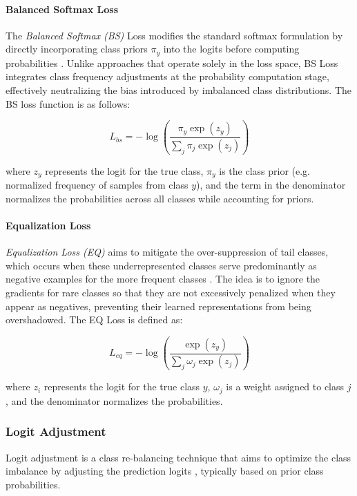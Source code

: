 \paragraph{Balanced Softmax Loss}
The \emph{Balanced Softmax (BS)} Loss modifies the standard softmax formulation by directly incorporating class priors $\pi_y$ into the logits before computing probabilities \cite{ren2020balancedmetasoftmaxlongtailedvisual}. Unlike approaches that operate solely in the loss space, BS Loss integrates class frequency adjustments at the probability computation stage, effectively neutralizing the bias introduced by imbalanced class distributions. The BS loss function is as follows:

\begin{equation}
    L_{bs} = - \log\left( \frac{\pi_y \exp(z_y)}{\sum_j \pi_j \exp(z_j)} \right)
\end{equation}

where $z_y$ represents the logit for the true class, $\pi_y$ is the class prior (e.g. normalized frequency of samples from class $y$), and the term in the denominator normalizes the probabilities across all classes while accounting for priors.


\paragraph{Equalization Loss}
\emph{Equalization Loss (EQ)} aims to mitigate the over-suppression of tail classes, which occurs when these underrepresented classes serve predominantly as negative examples for the more frequent classes \cite{tan2020equalizationlosslongtailedobject}. The idea is to ignore the gradients for rare classes so that they are not excessively penalized when they appear as negatives, preventing their learned representations from being overshadowed. The EQ Loss is defined as:

\begin{equation}
    L_{eq} = - \log\left( \frac{\exp(z_y)}{\sum_j \omega_j \exp(z_j)} \right)
\end{equation}

where $z_i$ represents the logit for the true class $y$, $\omega_j$ is a weight assigned to class $j$, and the denominator normalizes the probabilities.


\subsubsection{Logit Adjustment}
Logit adjustment is a class re-balancing technique that aims to optimize the class imbalance by adjusting the prediction logits \cite{menon2021longtaillearninglogitadjustment}, typically based on prior class probabilities. 

